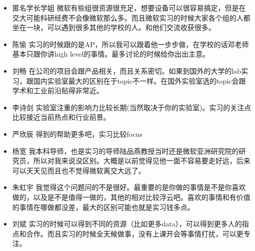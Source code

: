 \documentclass{vivid_layout}
\begin{document}
\begin{itemize}
\item {\name 匿名学长学姐}  \quad 微软有些组很资源很充足，想要设备可以很容易搞定，但是在交大可能科研经费不会像微软那么多。而且微软实习的时候大家各个组的人都坐在一块，可以遇到很多其他的学校的人。和他们交流收获很多。
\item  { 陈愉}  \quad 实习的时候跟的是AP，所以我可以跟着他一步步做，在学校的话邓老师基本只跟你讲high level的事情。最多讨论的时候给你出出主意。
\item  { 刘畅}  \quad 在公司的项目会跟产品相关，而且关系密切。如果到国外的大学的lab实习，跟国内实验室最大的区别在于topic不一样。在国外实验室选的topic会跟学术和工业前沿贴得非常近。
\item  { 李诗剑}  \quad 实验室注重的影响力比较长期(当然取决于你的实验室)。实习的关注点比较接近当前热点和行业前景。
\item  { 严欣辰}  \quad 得到的帮助更多吧，实习比较focus
\item  { 杨宽}  \quad 我本科导师，也是实习的导师陆品燕教授当时还是微软亚洲研究院的研究员，所以对我来说没区别。大概是以前觉得见他一面不容易要走好远，后来可以天天见而且也不觉得微软离交大远了。
\item  { 朱虹宇}  \quad 我觉得这个问题问的不是很好。最重要的是你做的事情是不是你喜欢做的，以及是不是值得一做的，其他的相对比较浮云吧。喜欢的事情和有价值的事情在哪做都没差，最大的区别可能也就是实习钱多点。
\item  { 刘斌}  \quad 实习的时候可以得到不同的资源（比如更多data），可以得到更多人的指点和合作。而且实习的时候全天候做事，没有上课开会等事情打扰，可以更专注。
\end{itemize}
\end{document}
